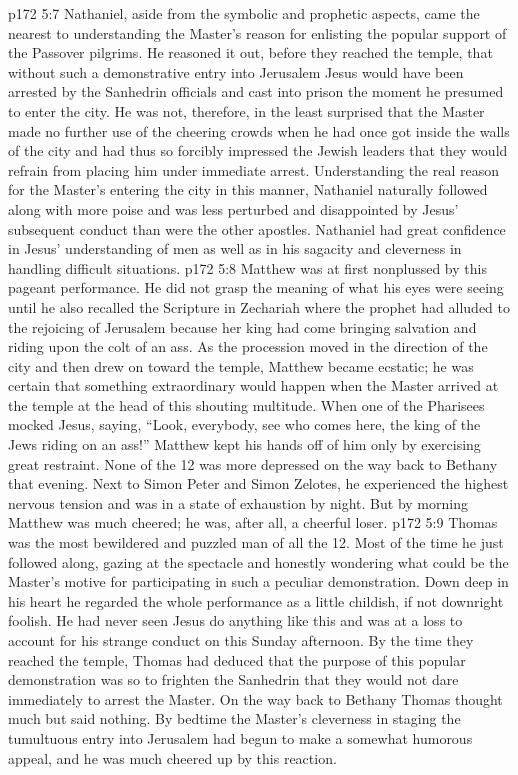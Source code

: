 \vs p172 5:7 \pc Nathaniel, aside from the symbolic and prophetic aspects, came the nearest to understanding the Master’s reason for enlisting the popular support of the Passover pilgrims. He reasoned it out, before they reached the temple, that without such a demonstrative entry into Jerusalem Jesus would have been arrested by the Sanhedrin officials and cast into prison the moment he presumed to enter the city. He was not, therefore, in the least surprised that the Master made no further use of the cheering crowds when he had once got inside the walls of the city and had thus so forcibly impressed the Jewish leaders that they would refrain from placing him under immediate arrest. Understanding the real reason for the Master’s entering the city in this manner, Nathaniel naturally followed along with more poise and was less perturbed and disappointed by Jesus’ subsequent conduct than were the other apostles. Nathaniel had great confidence in Jesus’ understanding of men as well as in his sagacity and cleverness in handling difficult situations.
\vs p172 5:8 \pc Matthew was at first nonplussed by this pageant performance. He did not grasp the meaning of what his eyes were seeing until he also recalled the Scripture in Zechariah where the prophet had alluded to the rejoicing of Jerusalem because her king had come bringing salvation and riding upon the colt of an ass. As the procession moved in the direction of the city and then drew on toward the temple, Matthew became ecstatic; he was certain that something extraordinary would happen when the Master arrived at the temple at the head of this shouting multitude. When one of the Pharisees mocked Jesus, saying, “Look, everybody, see who comes here, the king of the Jews riding on an ass!” Matthew kept his hands off of him only by exercising great restraint. None of the 12 was more depressed on the way back to Bethany that evening. Next to Simon Peter and Simon Zelotes, he experienced the highest nervous tension and was in a state of exhaustion by night. But by morning Matthew was much cheered; he was, after all, a cheerful loser.
\vs p172 5:9 \pc Thomas was the most bewildered and puzzled man of all the 12. Most of the time he just followed along, gazing at the spectacle and honestly wondering what could be the Master’s motive for participating in such a peculiar demonstration. Down deep in his heart he regarded the whole performance as a little childish, if not downright foolish. He had never seen Jesus do anything like this and was at a loss to account for his strange conduct on this Sunday afternoon. By the time they reached the temple, Thomas had deduced that the purpose of this popular demonstration was so to frighten the Sanhedrin that they would not dare immediately to arrest the Master. On the way back to Bethany Thomas thought much but said nothing. By bedtime the Master’s cleverness in staging the tumultuous entry into Jerusalem had begun to make a somewhat humorous appeal, and he was much cheered up by this reaction.
